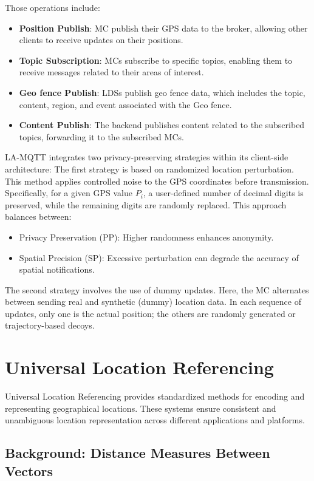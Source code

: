 Those operations include:
\begin{itemize}
    \item \textbf{Position Publish}: MC publish their GPS data to the broker, allowing other clients to receive updates on their positions.
    \item \textbf{Topic Subscription}: MCs subscribe to specific topics, enabling them to receive messages related to their areas of interest.
    \item \textbf{Geo fence Publish}: LDSs publish geo fence data, which includes the topic, content, region, and event associated with the Geo fence.
    \item \textbf{Content Publish}: The backend publishes content related to the subscribed topics, forwarding it to the subscribed MCs.
\end{itemize}

LA-MQTT integrates two privacy-preserving strategies within its client-side architecture:
The first strategy is based on randomized location perturbation. This method applies controlled noise to the GPS coordinates before transmission. Specifically, for a given GPS value $P_i$, a user-defined number of decimal digits is preserved, while the remaining digits are randomly replaced. This approach balances between:
\begin{itemize}
    \item Privacy Preservation (PP): Higher randomness enhances anonymity.
    \item Spatial Precision (SP): Excessive perturbation can degrade the accuracy of spatial notifications.
\end{itemize}
The second strategy involves the use of dummy updates. Here, the MC alternates between sending real and synthetic (dummy) location data. In each sequence of updates, only one is the actual position; the others are randomly generated or trajectory-based decoys.

\section{Universal Location Referencing}
Universal Location Referencing provides standardized methods for encoding and representing geographical locations. These systems ensure consistent and unambiguous location representation across different applications and platforms.

\subsection{Background: Distance Measures Between Vectors}
\label{sec:background-distances}

